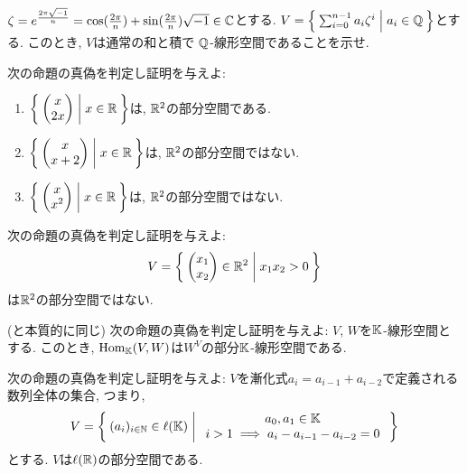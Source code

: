 \begin{quiz}
  $\zeta = e^{\frac{2\pi\sqrt{-1}}{n}}=\cos(\frac{2\pi}{n})+\sin(\frac{2\pi}{n})\sqrt{-1}\in \mathbb{C}$とする.
  $V=\Set{\sum_{i=0}^{n-1}a_i \zeta^i|a_i\in \mathbb{Q}}$とする.
  このとき, $V$は通常の和と積で
  $\mathbb{Q}$-線形空間であることを示せ.
\end{quiz}

\begin{quiz}
  次の命題の真偽を判定し証明を与えよ:
  \begin{enumerate}
  \item $\Set{\begin{pmatrix}x\\2x \end{pmatrix} | x\in\mathbb{R}}$は,
    $\mathbb{R}^2$の部分空間である.
  \item $\Set{\begin{pmatrix}x\\x+2 \end{pmatrix} | x\in\mathbb{R}}$は,
    $\mathbb{R}^2$の部分空間ではない.
  \item $\Set{\begin{pmatrix}x\\x^2 \end{pmatrix} | x\in\mathbb{R}}$は,
    $\mathbb{R}^2$の部分空間ではない.
  \end{enumerate}
\end{quiz}

\begin{quiz}
  次の命題の真偽を判定し証明を与えよ:
  \begin{align*}
    V=\Set{\begin{pmatrix}x_1\\x_2\end{pmatrix}\in\mathbb{R}^2|x_1x_2>0}
  \end{align*}
  は$\mathbb{R}^2$の部分空間ではない.
\end{quiz}

\begin{quiz}
  (と本質的に同じ)
  次の命題の真偽を判定し証明を与えよ:
  $V$, $W$を$\mathbb{K}$-線形空間とする.
  このとき, $\operatorname{Hom}_{\mathbb{K}}(V,W)$は$W^V$の部分$\mathbb{K}$-線形空間である.
\end{quiz}

\begin{quiz}
  次の命題の真偽を判定し証明を与えよ:
  $V$を漸化式$a_i=a_{i-1}+a_{i-2}$で定義される数列全体の集合, つまり,
  \begin{align*}
    V=\Set{(a_i)_{i\in \mathbb{N}}\in \ell(\mathbb{K})|
      \begin{array}{c}
        a_0,a_1\in\mathbb{K}\\
        i>1\implies a_{i}-a_{i-1}-a_{i-2}=0
      \end{array}
    }
  \end{align*}
  とする.
  $V$は$\ell(\mathbb{R})$の部分空間である.
\end{quiz}

